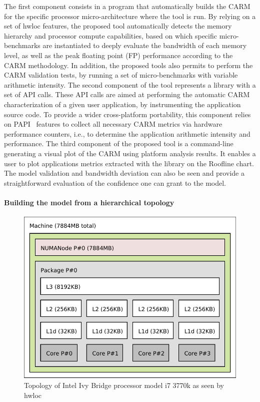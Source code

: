 \documentclass[twoside,twocolumn,8pt]{extarticle}
\begin{document}
The first component consists in a program that automatically  builds the CARM for the specific processor micro-architecture where
the tool is run. By relying on a set of hwloc features, the proposed tool automatically detects the memory hierarchy and processor
compute capabilities, based on which specific micro-benchmarks are instantiated to deeply evaluate the bandwidth of each memory
level,  as well as the peak floating point (FP) performance according to the CARM methodology.
In addition, the proposed tools also permits to perform the CARM validation tests, by running a set of micro-benchmarks with
variable arithmetic intensity. 
The second component of the tool represents  a library with a set of API calls. These API calls are aimed at performing the
automatic CARM characterization of a given user application, by instrumenting the application source code.
To provide a wider cross-platform portability, this component relies on PAPI~\cite{mucci1999papi} features to collect all
necessary CARM metrics via hardware performance counters, i.e., to determine the application arithmetic intensity and performance.
The third component of the proposed tool is a command-line generating a visual plot of the CARM using platform analysis results. It
enables a user to plot applications metrics extracted with the library on the Roofline chart. The model validation and bandwidth
deviation can also be seen and provide a straightforward evaluation of the confidence one can grant to the model.

\paragraph*{Building the model from a hierarchical topology}

\begin{figure}
  \includegraphics[width=.5\textwidth]{pictures/i7_3770k.pdf}
  \caption{Topology of Intel Ivy Bridge processor model i7 3770k as seen by hwloc}
  \label{fig:topology_adriana}
\end{figure}
\end{document}
